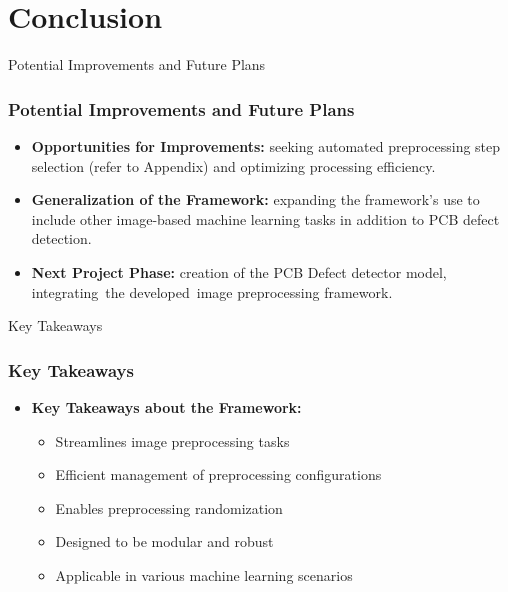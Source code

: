 \section{Conclusion}
\label{conclusion_section}


\begin{frame}{Potential Improvements and Future Plans}
    \frametitle{Potential Improvements and Future Plans}
    \begin{itemize}
        \item \textbf{Opportunities for Improvements:} seeking automated preprocessing step selection (refer to Appendix) and optimizing processing efficiency.
        \item \textbf{Generalization of the Framework:} expanding the framework's use to include other image-based machine learning tasks in addition to PCB defect detection.
        \item \textbf{Next Project Phase:} creation of the PCB Defect detector model, integrating the developed image preprocessing framework.
    \end{itemize}
\end{frame}

\begin{frame}{Key Takeaways}
    \frametitle{Key Takeaways}
    \begin{itemize}
        \item \textbf{Key Takeaways about the Framework:}
        \vspace{1em}
        \begin{itemize}
            \item Streamlines image preprocessing tasks
            \vspace{0.5em}
            \item Efficient management of preprocessing configurations
            \vspace{0.5em}
            \item Enables preprocessing randomization
            \vspace{0.5em}
            \item Designed to be modular and robust
            \vspace{0.5em}
            \item Applicable in various machine learning scenarios
        \end{itemize}
    \end{itemize}
\end{frame}
